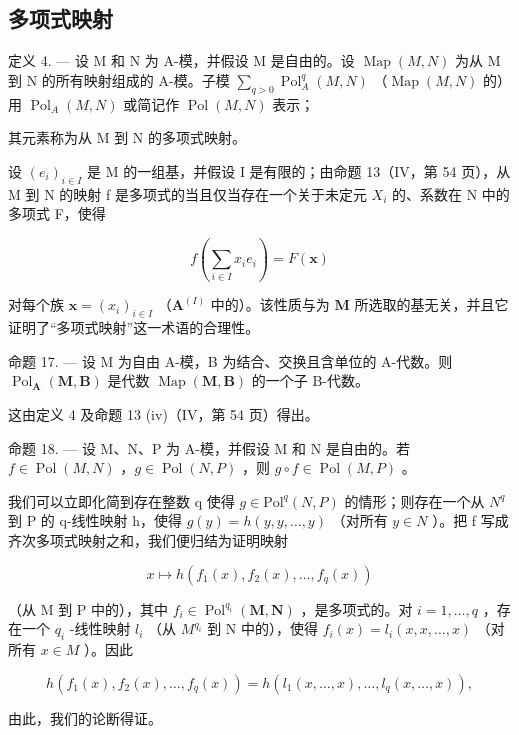 \subsection{多项式映射}

定义 4. --- 设 M 和 N 为 A-模，并假设 M 是自由的。设 \(\operatorname{Map}(M, N)\) 为从 M 到 N 的所有映射组成的 A-模。子模 \(\sum_{q > 0} \operatorname{Pol}_{A}^{q}(M, N)\) （\(\operatorname{Map}(M, N)\) 的）用 \(\operatorname{Pol}_{A}(M, N)\) 或简记作 \(\operatorname{Pol}(M, N)\) 表示；

其元素称为从 M 到 N 的多项式映射。

设 \((e_{i})_{i\in I}\) 是 M 的一组基，并假设 I 是有限的；由命题 13（IV，第 54 页），从 M 到 N 的映射 f 是多项式的当且仅当存在一个关于未定元 \(X_{i}\) 的、系数在 N 中的多项式 F，使得

\[
f \left(\sum_ {i \in I} x _ {i} e _ {i}\right) = F (\mathbf {x})
\]

对每个族 \(\mathbf{x} = (x_i)_{i\in I}\) （\(\mathbf{A}^{(I)}\) 中的）。该性质与为 \(\mathbf{M}\) 所选取的基无关，并且它证明了“多项式映射”这一术语的合理性。

命题 17. --- 设 M 为自由 A-模，B 为结合、交换且含单位的 A-代数。则 \(\operatorname{Pol}_{\mathbf{A}}(\mathbf{M}, \mathbf{B})\) 是代数 \(\operatorname{Map}(\mathbf{M}, \mathbf{B})\) 的一个子 B-代数。

这由定义 4 及命题 13 (iv)（IV，第 54 页）得出。

命题 18. --- 设 M、N、P 为 A-模，并假设 M 和 N 是自由的。若 \(f \in \operatorname{Pol}(M, N)\) ，\(g \in \operatorname{Pol}(N, P)\) ，则 \(g \circ f \in \operatorname{Pol}(M, P)\) 。

我们可以立即化简到存在整数 q 使得 \(g \in \text{Pol}^{q}(N, P)\) 的情形；则存在一个从 \(N^{q}\) 到 P 的 q-线性映射 h，使得 \(g(y) = h(y, y, \ldots, y)\) （对所有 \(y \in N\) ）。把 f 写成齐次多项式映射之和，我们便归结为证明映射

\[
x \mapsto h (f _ {1} (x), f _ {2} (x), \dots , f _ {q} (x))
\]

（从 M 到 P 中的），其中 \(f_{i} \in \operatorname{Pol}^{q_{i}}(\mathbf{M}, \mathbf{N})\) ，是多项式的。对 \(i = 1, \ldots, q\) ，存在一个 \(q_{i}\) -线性映射 \(l_{i}\) （从 \(M^{q_{i}}\) 到 N 中的），使得 \(f_{i}(x) = l_{i}(x, x, \ldots, x)\) （对所有 \(x \in M\) ）。因此

\[
h \left(f _ {1} (x), f _ {2} (x), \dots , f _ {q} (x)\right) = h \left(l _ {1} (x, \dots , x), \dots , l _ {q} (x, \dots , x)\right),
\]

由此，我们的论断得证。

